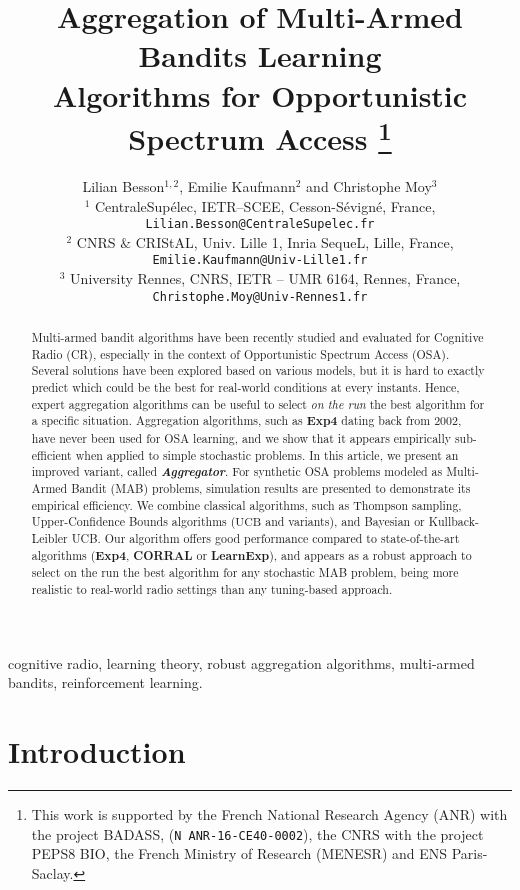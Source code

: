 \documentclass[conference]{IEEEtran}
\title{Aggregation of Multi-Armed Bandits Learning \\
	   Algorithms for Opportunistic Spectrum Access
\thanks{
	This work is supported by the French National Research Agency (ANR) with the project BADASS,
	(\texttt{N ANR-16-CE40-0002}),
	the CNRS with the project PEPS8 BIO,
	the French Ministry of Research (MENESR) and ENS Paris-Saclay.}
}
\author{
Lilian Besson$^{1,2}$, Emilie Kaufmann$^{2}$ and Christophe Moy$^{3}$ \vspace{0.3cm} \\


$^1$ CentraleSup\'elec, IETR--SCEE, Cesson-S\'evign\'e, France, \texttt{Lilian.Besson@CentraleSupelec.fr} \\
$^2$ CNRS $\&$ CRIStAL, Univ. Lille 1, Inria SequeL, Lille, France, \texttt{Emilie.Kaufmann@Univ-Lille1.fr} \\
$^3$ University Rennes, CNRS, IETR -- UMR 6164, Rennes, France, \texttt{Christophe.Moy@Univ-Rennes1.fr}}
\theoremstyle{plain}  %
\newcommand{\UCB}[0]{$\mathrm{UCB}$}
\newcommand{\Aggr}[0]{\textbf{Aggregator}}
\newcommand{\ExpQ}[0]{\textbf{Exp4}}
\newcommand{\CORRAL}[0]{\textbf{CORRAL}}
\newcommand{\LearnExp}[0]{\textbf{LearnExp}}
\begin{document}
\maketitle

\begin{abstract}
	Multi-armed bandit algorithms have been recently studied and evaluated
	for Cognitive Radio (CR),
	especially in the context of Opportunistic Spectrum Access (OSA).
	Several solutions have been explored based on various models,
	but it is hard to exactly predict which could be the best for real-world conditions at every instants.
	Hence, expert aggregation algorithms can be useful to select \emph{on the run} the best algorithm for a specific situation.
	Aggregation algorithms, such as \ExpQ{}
	dating back from 2002,
	have never been used for OSA learning,
	and we show that it appears empirically sub-efficient when applied to simple stochastic problems.
	In this article, we present an improved variant, called \emph{\Aggr}.
	For synthetic OSA problems modeled as Multi-Armed Bandit (MAB) problems,
	simulation results are presented to demonstrate its empirical efficiency.
	We combine classical algorithms, such as Thompson sampling, Upper-Confidence Bounds algorithms (\UCB{} and variants), and Bayesian or Kullback-Leibler UCB.
	Our algorithm offers good performance compared to state-of-the-art algorithms
	(\ExpQ{}, \CORRAL{} or \LearnExp{}),
	and appears as a robust approach to select on the run the best algorithm for any stochastic MAB problem, being more realistic to real-world radio settings than any tuning-based approach.
\end{abstract}

\begin{IEEEkeywords}
	cognitive radio, learning theory, robust aggregation algorithms, multi-armed bandits, reinforcement learning.
\end{IEEEkeywords}


\section{Introduction}\label{seq:introduction}
\end{document}

